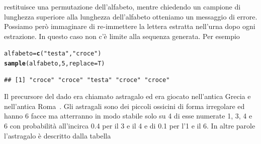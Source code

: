 \documentclass[onecolumn,12pt]{book}\usepackage[]{graphicx}\usepackage[]{color}
\makeatletter
\newcommand{\hlnum}[1]{\textcolor[rgb]{0.686,0.059,0.569}{#1}}%
\newcommand{\hlstr}[1]{\textcolor[rgb]{0.192,0.494,0.8}{#1}}%
\newcommand{\hlstd}[1]{\textcolor[rgb]{0.345,0.345,0.345}{#1}}%
\newcommand{\hlkwb}[1]{\textcolor[rgb]{0.69,0.353,0.396}{#1}}%
\newcommand{\hlkwc}[1]{\textcolor[rgb]{0.333,0.667,0.333}{#1}}%
\newcommand{\hlkwd}[1]{\textcolor[rgb]{0.737,0.353,0.396}{\textbf{#1}}}%
\newenvironment{kframe}{%
 \def\at@end@of@kframe{}%
 \ifinner\ifhmode%
  \def\at@end@of@kframe{\end{minipage}}%
  \begin{minipage}{\columnwidth}%
 \fi\fi%
 \def\FrameCommand##1{\hskip\@totalleftmargin \hskip-\fboxsep
 \colorbox{shadecolor}{##1}\hskip-\fboxsep
     \hskip-\linewidth \hskip-\@totalleftmargin \hskip\columnwidth}%
 \MakeFramed {\advance\hsize-\width
   \@totalleftmargin\z@ \linewidth\hsize
   \@setminipage}}%
 {\par\unskip\endMakeFramed%
 \at@end@of@kframe}
\newenvironment{knitrout}{}{} %
\makeatother
\begin{document}
restituisce una permutazione dell'alfabeto, mentre chiedendo un campione di lunghezza superiore alla lunghezza dell'alfabeto otteniamo un messaggio di errore. Possiamo per\`o immaginare di re-immettere la lettera estratta nell'urna dopo ogni estrazione. In questo caso non c'\`e limite alla sequenza generata.
Per esempio
\begin{knitrout}
\color{fgcolor}\begin{kframe}
\begin{alltt}
\hlstd{alfabeto}\hlkwb{=}\hlkwd{c}\hlstd{(}\hlstr{"testa"}\hlstd{,}\hlstr{"croce"}\hlstd{)}
\hlkwd{sample}\hlstd{(alfabeto,}\hlnum{5}\hlstd{,}\hlkwc{replace}\hlstd{=T)}
\end{alltt}
\begin{verbatim}
## [1] "croce" "croce" "testa" "croce" "croce"
\end{verbatim}
\end{kframe}
\end{knitrout}
 

Il precursore  del dado era chiamato astragalo ed era giocato nell'antica Grecia e nell'antica Roma~\cite{david}.
Gli  astragali sono dei piccoli ossicini di forma irregolare ed hanno 6 facce ma atterranno in  modo stabile solo su 4 di esse numerate 1, 3, 4 e 6  con probabilit\`a all'incirca 0.4 per il 3 e il 4  e di 0.1 per l'1 e il 6. In altre parole l'astragalo \`e descritto dalla tabella
\end{document}
